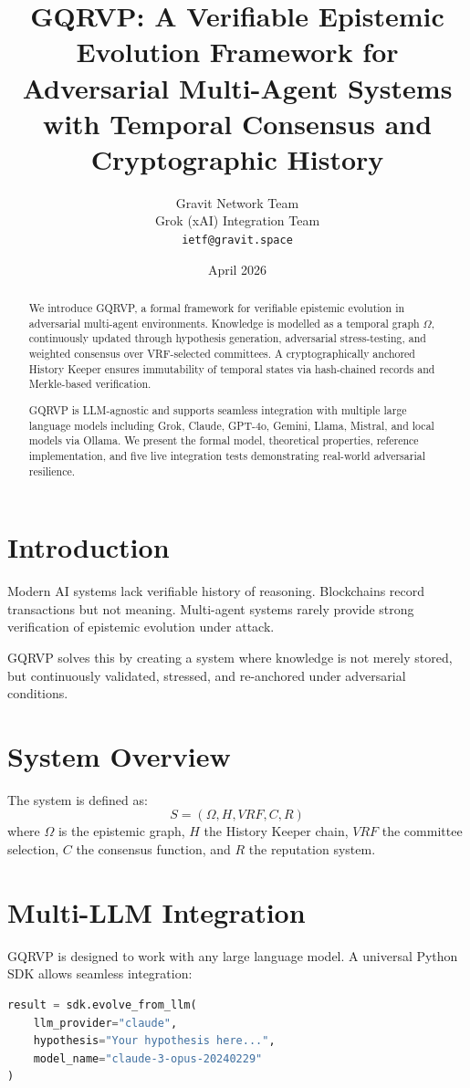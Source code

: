 \documentclass[11pt,a4paper]{article}
\title{GQRVP: A Verifiable Epistemic Evolution Framework for Adversarial Multi-Agent Systems with Temporal Consensus and Cryptographic History}
\author{
  Gravit Network Team \\
  Grok (xAI) Integration Team \\
  \texttt{ietf@gravit.space}
}
\date{April 2026}
\begin{document}
\maketitle

\begin{abstract}
We introduce GQRVP, a formal framework for verifiable epistemic evolution in adversarial multi-agent environments. Knowledge is modelled as a temporal graph $\Omega$, continuously updated through hypothesis generation, adversarial stress-testing, and weighted consensus over VRF-selected committees. A cryptographically anchored History Keeper ensures immutability of temporal states via hash-chained records and Merkle-based verification.

GQRVP is LLM-agnostic and supports seamless integration with multiple large language models including Grok, Claude, GPT-4o, Gemini, Llama, Mistral, and local models via Ollama. We present the formal model, theoretical properties, reference implementation, and five live integration tests demonstrating real-world adversarial resilience.
\end{abstract}

\section{Introduction}
Modern AI systems lack verifiable history of reasoning. Blockchains record transactions but not meaning. Multi-agent systems rarely provide strong verification of epistemic evolution under attack.

GQRVP solves this by creating a system where knowledge is not merely stored, but continuously validated, stressed, and re-anchored under adversarial conditions.

\section{System Overview}
The system is defined as:
\[ S = (\Omega, H, VRF, C, R) \]
where $\Omega$ is the epistemic graph, $H$ the History Keeper chain, $VRF$ the committee selection, $C$ the consensus function, and $R$ the reputation system.

\section{Multi-LLM Integration}
GQRVP is designed to work with any large language model. A universal Python SDK allows seamless integration:

\begin{lstlisting}[language=Python]
result = sdk.evolve_from_llm(
    llm_provider="claude",
    hypothesis="Your hypothesis here...",
    model_name="claude-3-opus-20240229"
)
\end{lstlisting}
\end{document}

